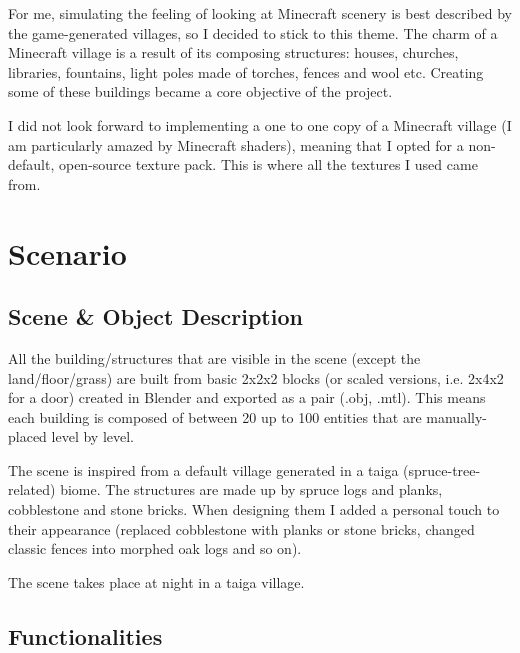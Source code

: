 \documentclass[12pt]{article}
\begin{document}
	For me, simulating the feeling of looking at Minecraft scenery is best described by the game-generated villages, so I decided to stick to this theme. The charm of a Minecraft village is a result of its composing structures: houses, churches, libraries, fountains, light poles made of torches, fences and wool etc. Creating some of these buildings became a core objective of the project.
	
	I did not look forward to implementing a one to one copy of a Minecraft village (I am particularly amazed by Minecraft shaders), meaning that I opted for a non-default, open-source texture pack. This is where all the textures I used came from. 
	
	\section{Scenario}
	\subsection{Scene \& Object Description}
	
	All the building/structures that are visible in the scene (except the land/floor/grass) are built from basic 2x2x2 blocks (or scaled versions, i.e. 2x4x2 for a door) created in Blender and exported as a pair (.obj, .mtl). This means each building is composed of between 20 up to 100 entities that are manually-placed level by level. 
	
	The scene is inspired from a default village generated in a taiga (spruce-tree-related) biome. The structures are made up by spruce logs and planks, cobblestone and stone bricks. When designing them I added a personal touch to their appearance (replaced cobblestone with planks or stone bricks, changed classic fences into morphed oak logs and so on).
	
	The scene takes place at night in a taiga village.  

	\subsection{Functionalities}
	
\end{document}
